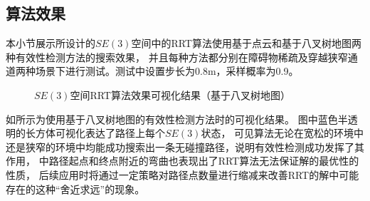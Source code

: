 \subsection{算法效果}\label{subsec:performance_of_rrtse3}
本小节展示所设计的$SE(3)$空间中的RRT算法使用基于点云和基于八叉树地图两种有效性检测方法的搜索效果，
并且每种方法都分别在障碍物稀疏及穿越狭窄通道两种场景下进行测试。测试中设置步长为0.8m，采样概率为0.9。
\begin{figure}[!ht]
  \setlength{\subfigcapskip}{-1bp}
  \centering
  \begin{minipage}{\textwidth}

  \centering
  \subfigure{\label{fig:rrtse3_octomap_in_sparse_env_overview}}\addtocounter{subfigure}{-2}
  \hspace{0.2em}
  \subfigure{\label{fig:rrtse3_octomap_in_sparse_env_detail}}\addtocounter{subfigure}{-2}
  \hspace{0.2em}
  \subfigure{\label{fig:rrtse3_octomap_in_narrow_passage_overview}}\addtocounter{subfigure}{-2}
  \hspace{0.2em}
  \subfigure{\label{fig:rrtse3_octomap_in_narrow_passage_detail}}\addtocounter{subfigure}{-2}
  
  \end{minipage}
  \caption{$SE(3)$空间RRT算法效果可视化结果（基于八叉树地图）}
  \label{fig:performance_of_rrtse3_octomap}
\end{figure}

如所示为使用基于八叉树地图的有效性检测方法时的可视化结果。
图中蓝色半透明的长方体可视化表达了路径上每个$SE(3)$状态，
可见算法无论在宽松的环境中还是狭窄的环境中均能成功搜索出一条无碰撞路径，说明有效性检测成功发挥了其作用，
中路径起点和终点附近的弯曲也表现出了RRT算法无法保证解的最优性的性质，
后续应用时将通过一定策略对路径点数量进行缩减来改善RRT的解中可能存在的这种“舍近求远”的现象。


